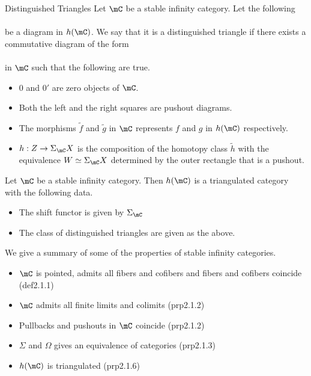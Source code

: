 \documentclass[a4paper]{article}
\begin{document}
\begin{defn}{Distinguished Triangles}{} Let $\mC$ be a stable infinity category. Let the following \\
\\
be a diagram in $h(\mC)$. We say that it is a distinguished triangle if there exists a commutative diagram of the form \\
\\
in $\mC$ such that the following are true. 
\begin{itemize}
\item $0$ and $0'$ are zero objects of $\mC$. 
\item Both the left and the right squares are pushout diagrams. 
\item The morphisms $\widetilde{f}$ and $\widetilde{g}$ in $\mC$ represents $f$ and $g$ in $h(\mC)$ respectively. 
\item $h:Z\to\Sigma_\mC X$ is the composition of the homotopy class $\widetilde{h}$ with the equivalence $W\simeq\Sigma_\mC X$ determined by the outer rectangle that is a pushout. 
\end{itemize}
\end{defn}

\begin{prp}{}{} Let $\mC$ be a stable infinity category. Then $h(\mC)$ is a triangulated category with the following data. 
\begin{itemize}
\item The shift functor is given by $\Sigma_\mC$
\item The class of distinguished triangles are given as the above. 
\end{itemize}
\end{prp}

We give a summary of some of the properties of stable infinity categories. 
\begin{itemize}
\item $\mC$ is pointed, admits all fibers and cofibers and fibers and cofibers coincide (def2.1.1)
\item $\mC$ admits all finite limits and colimits (prp2.1.2)
\item Pullbacks and pushouts in $\mC$ coincide (prp2.1.2)
\item $\Sigma$ and $\Omega$ gives an equivalence of categories (prp2.1.3)
\item $h(\mC)$ is triangulated (prp2.1.6)
\end{itemize}
\end{document}
